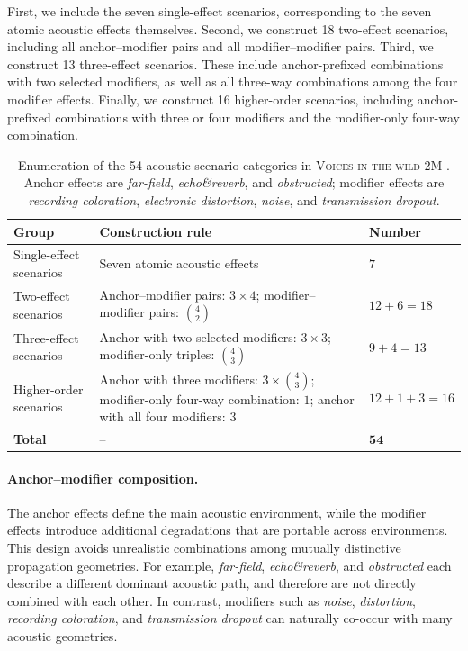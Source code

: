 \documentclass{llmxive}
\providecommand{\arraystretch}{1.05}
\begin{document}
First, we include the seven single-effect scenarios, corresponding to the seven
atomic acoustic effects themselves. Second, we construct 18 two-effect
scenarios, including all anchor--modifier pairs and all modifier--modifier
pairs. Third, we construct 13 three-effect scenarios. These include
anchor-prefixed combinations with two selected modifiers, as well as all
three-way combinations among the four modifier effects. Finally, we construct
16 higher-order scenarios, including anchor-prefixed combinations with three or
four modifiers and the modifier-only four-way combination.

\begin{table}[t]
\centering
\small
\setlength{\tabcolsep}{5pt}
\renewcommand{\arraystretch}{1.15}
\begin{tabular}{p{} p{} p{}}
\toprule
\textbf{Group} & \textbf{Construction rule} & \textbf{Number} \\
\midrule
Single-effect scenarios
& Seven atomic acoustic effects
& $7$ \\

Two-effect scenarios
& Anchor--modifier pairs: $3 \times 4$; modifier--modifier pairs: $\binom{4}{2}$
& $12 + 6 = 18$ \\

Three-effect scenarios
& Anchor with two selected modifiers: $3 \times 3$; modifier-only triples: $\binom{4}{3}$
& $9 + 4 = 13$ \\

Higher-order scenarios
& Anchor with three modifiers: $3 \times \binom{4}{3}$; modifier-only four-way combination: $1$; anchor with all four modifiers: $3$
& $12 + 1 + 3 = 16$ \\
\midrule
\textbf{Total}
& --
& $\textbf{54}$ \\
\bottomrule
\end{tabular}
\caption{Enumeration of the 54 acoustic scenario categories in  \textsc{Voices-in-the-wild-2M} . Anchor effects are \textit{far-field}, \textit{echo\&reverb}, and \textit{obstructed}; modifier effects are \textit{recording coloration}, \textit{electronic distortion}, \textit{noise}, and \textit{transmission dropout}.}
\label{tab:compound_scenario_count}
\end{table}

\paragraph{Anchor--modifier composition.}
The anchor effects define the main acoustic environment, while the modifier
effects introduce additional degradations that are portable across environments.
This design avoids unrealistic combinations among mutually distinctive
propagation geometries. For example, \textit{far-field}, \textit{echo\&reverb},
and \textit{obstructed} each describe a different dominant acoustic path, and
therefore are not directly combined with each other. In contrast, modifiers such
as \textit{noise}, \textit{distortion}, \textit{recording coloration},
and \textit{transmission dropout} can naturally co-occur with many acoustic
geometries.
\end{document}
